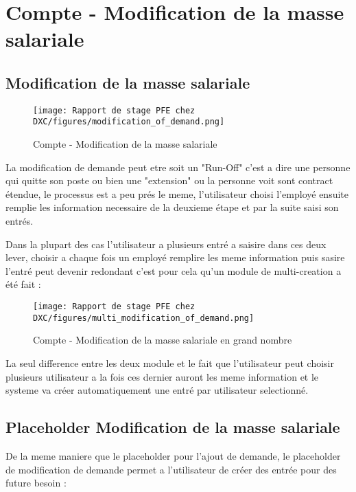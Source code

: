 \section{Compte - Modification de la masse salariale}

\subsection{Modification de la masse salariale}
\begin{figure}[H]
    \centering
    \texttt{[image: Rapport de stage PFE chez DXC/figures/modification\_of\_demand.png]}
    \caption{Compte - Modification de la masse salariale}
\end{figure}

La modification de demande peut etre soit un "Run-Off" c'est a dire une personne qui quitte son poste ou bien une "extension" ou la personne voit sont contract étendue, le processus est a peu prés le meme, l'utilisateur choisi l'employé ensuite remplie les information necessaire de la deuxieme étape et par la suite saisi son entrés.

\newpage

Dans la plupart des cas l'utilisateur a plusieurs entré a saisire dans ces deux lever, choisir a chaque fois un employé remplire les meme information puis sasire l'entré peut devenir redondant c'est pour cela qu'un module de multi-creation a été fait :

\begin{figure}[H]
    \centering
    \texttt{[image: Rapport de stage PFE chez DXC/figures/multi\_modification\_of\_demand.png]}
    \caption{Compte - Modification de la masse salariale en grand nombre}
\end{figure}

La seul difference entre les deux module et le fait que l'utilisateur peut choisir plusieurs utilisateur a la fois ces dernier auront les meme information et le systeme va créer automatiquement une entré par utilisateur selectionné.

\newpage

\subsection{Placeholder Modification de la masse salariale}

De la meme maniere que le placeholder pour l'ajout de demande, le placeholder de modification de demande permet a l'utilisateur de créer des entrée pour des future besoin :

